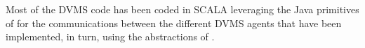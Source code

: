 Most of the DVMS code has been coded in SCALA leveraging the Java
primitives of \sg for the communications between the different DVMS
agents that have been implemented, in turn, using the abstractions of \vmps.




%


